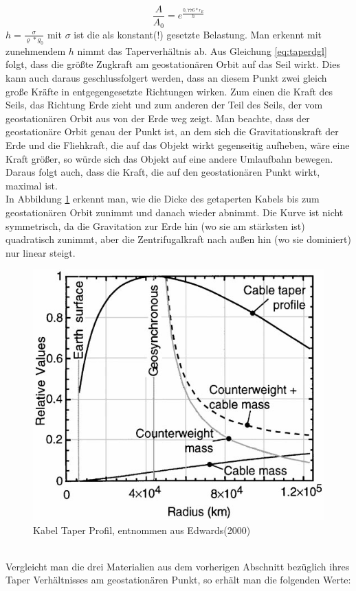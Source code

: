 \documentclass[a4paper, 10pt]{report}
\begin{document}
\begin{equation}
\frac{A}{A_0} = e^\frac{0,776*r_E}{h}
\label{eq:taperratio}
\end{equation}
$h=\frac{\sigma}{\varrho*g_0}$ mit $\sigma$ ist die als konstant(!) gesetzte Belastung. Man erkennt mit zunehmendem $h$ nimmt das Taperverhältnis ab.
Aus Gleichung \ref{eq:taperdgl} folgt, dass die größte Zugkraft am geostationären Orbit auf das Seil wirkt. Dies kann auch daraus geschlussfolgert werden, dass an diesem Punkt zwei gleich große Kräfte in entgegengesetzte Richtungen wirken. Zum einen die Kraft des Seils, das Richtung Erde zieht und zum anderen der Teil des Seils, der vom geostationären Orbit aus von der Erde weg zeigt. Man beachte, dass der geostationäre Orbit genau der Punkt ist, an dem sich die Gravitationskraft der Erde und die Fliehkraft, die auf das Objekt wirkt gegenseitig aufheben, wäre eine Kraft größer, so würde sich das Objekt auf eine andere Umlaufbahn bewegen. Daraus folgt auch, dass die Kraft, die auf den geostationären Punkt wirkt, maximal ist. \\
In Abbildung \ref{fig:Tapering} erkennt man, wie die Dicke des getaperten Kabels bis zum geostationären Orbit zunimmt und danach wieder abnimmt. Die Kurve ist nicht symmetrisch, da die Gravitation zur Erde hin (wo sie am stärksten ist) quadratisch zunimmt, aber die Zentrifugalkraft nach außen hin (wo sie dominiert) nur linear steigt.
\begin{figure}[!htb]
\centering
\includegraphics[scale=0.4]{Tapering.png} 
\caption{Kabel Taper Profil, entnommen aus Edwards(2000)\cite{ED00}}
\label{fig:Tapering}
\end{figure}
\\
Vergleicht man die drei Materialien aus dem vorherigen Abschnitt bezüglich ihres Taper Verhältnisses am geostationären Punkt, so erhält man die folgenden Werte\cite{AR07}:
\end{document}
